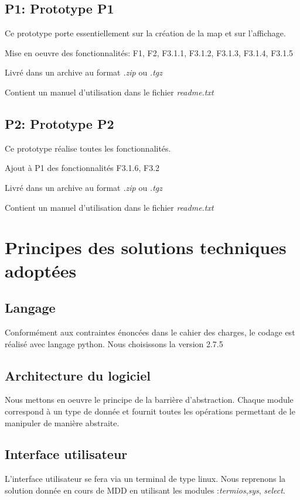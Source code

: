 \documentclass[a4paper]{article}
\begin{document}
        \subsection{P1: Prototype P1}
        Ce prototype porte essentiellement sur la création de la map et sur l'affichage.
        
        Mise en oeuvre des fonctionnalités: F1, F2, F3.1.1, F3.1.2, F3.1.3, F3.1.4, F3.1.5
        
        Livré dans un archive au format \emph{.zip} ou \emph{.tgz}
        
        Contient un manuel d'utilisation dans le fichier \emph{readme.txt}
        \subsection{P2: Prototype P2}
        Ce prototype réalise toutes les fonctionnalités.
        
        Ajout à P1 des fonctionnalités F3.1.6, F3.2
        
        Livré dans un archive au format \emph{.zip} ou \emph{.tgz}
        
        Contient un manuel d'utilisation dans le fichier \emph{readme.txt}
        \newpage
        
    \section{Principes des solutions techniques adoptées}
        \subsection{Langage}
        Conformément aux contraintes énoncées dans le cahier des charges, le codage est réalisé
        avec langage python. Nous choisissons la version 2.7.5

        \subsection{Architecture du logiciel}
        Nous mettons en oeuvre le principe de la barrière d'abstraction. Chaque module correspond
        à un type de donnée et fournit toutes les opérations permettant de le manipuler de manière
        abstraite.

        \subsection{Interface utilisateur}
        L'interface utilisateur se fera via un terminal de type linux. Nous reprenons la solution donnée en cours de MDD en utilisant les modules :\emph{termios},\emph{sys}, \emph{select}.
\end{document}
